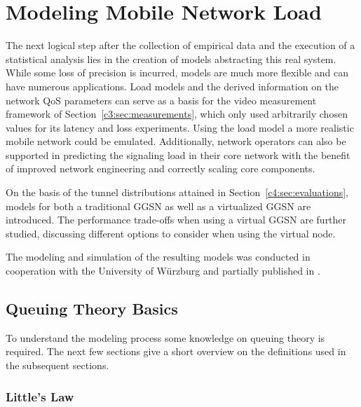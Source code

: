 \section{Modeling Mobile Network Load}
\label{c4:sec:modeling}

The next logical step after the collection of empirical data and the execution of a statistical analysis lies in the creation of models abstracting this real system. While some loss of precision is incurred, models are much more flexible and can have numerous applications. Load models and the derived information on the network \gls{QoS} parameters can serve as a basis for the video measurement framework of Section~\ref{c3:sec:measurements}, which only used arbitrarily chosen values for its latency and loss experiments. Using the load model a more realistic mobile network could be emulated. Additionally, network operators can also be supported in predicting the signaling load in their core network with the benefit of improved network engineering and correctly scaling core components.

On the basis of the tunnel distributions attained in Section~\ref{c4:sec:evaluations}, models for both a traditional \gls{GGSN} as well as a virtualized \gls{GGSN} are introduced. The performance trade-offs when using a virtual \gls{GGSN} are further studied, discussing different options to consider when using the virtual node.

The modeling and simulation of the resulting models was conducted in cooperation with the University of Würzburg and partially published in \cite{metzger2014lossmodel}.


\subsection{Queuing Theory Basics}

To understand the modeling process some knowledge on queuing theory is required. The next few sections give a short overview on the definitions used in the subsequent sections.


\subsubsection{Little's Law}

